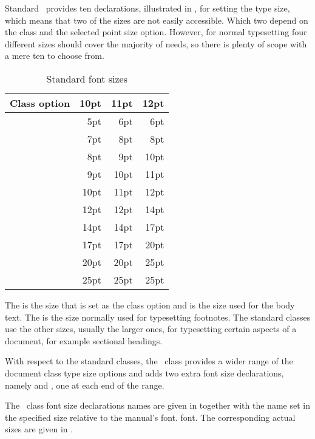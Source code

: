  Standard
\ltx\ provides ten
declarations, illustrated in , for setting the type size, 
which means that two of the sizes are
not easily accessible. Which two depend on the class and the 
selected point size option. However, for normal typesetting four different
sizes should cover the majority of needs, so there is plenty of scope with
a mere ten to choose from.

\begin{table}
\centering
\caption{Standard font sizes} \label{tab:standardclassfontsize}
\begin{tabular}{lrrr} \toprule
Class option        & 10pt & 11pt & 12pt \\ \midrule
\cmd{\tiny}         &  5pt &  6pt &  6pt \\
\cmd{\scriptsize}   &  7pt &  8pt &  8pt \\
\cmd{\footnotesize} &  8pt &  9pt & 10pt \\
\cmd{\small}        &  9pt & 10pt & 11pt \\
\cmd{\normalsize}   & 10pt & 11pt & 12pt \\ 
\cmd{\large}        & 12pt & 12pt & 14pt \\
\cmd{\Large}        & 14pt & 14pt & 17pt \\
\cmd{\LARGE}        & 17pt & 17pt & 20pt \\
\cmd{\huge}         & 20pt & 20pt & 25pt \\
\cmd{\Huge}         & 25pt & 25pt & 25pt \\ 
\bottomrule
\end{tabular}
\end{table}

    The \cmd{\normalsize} is the size that is set as the class 
option and is the size used for the body 
text. The \cmd{\footnotesize} is the size normally
used for typesetting footnotes. The standard classes 
use the other sizes, usually the larger ones, for typesetting certain 
aspects of a document, for example sectional headings. 

With respect to the standard classes, the \Mname\ class 
provides a wider range of the document class type size options and
adds two extra font size declarations, namely \cmd{\miniscule}
and \cmd{\HUGE}, one at each end of the range.

    The \Mname\ class font size declarations names are given in 
 together with the name set in the specified size 
relative to the manual's  font.
font. The corresponding actual sizes are given in .

